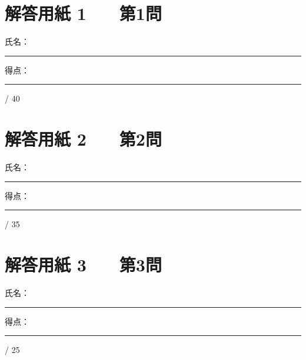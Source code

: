 \thispagestyle{fancy}
\section*{解答用紙 1　　第1問}
\begin{flushright}
氏名：\rule{45mm}{0.4pt}\qquad 得点：\rule{15mm}{0.4pt} / 40
\end{flushright}
\newpage

\section*{解答用紙 2　　第2問}
\begin{flushright}
氏名：\rule{45mm}{0.4pt}\qquad 得点：\rule{15mm}{0.4pt} / 35
\end{flushright}
\newpage

\section*{解答用紙 3　　第3問}
\begin{flushright}
氏名：\rule{45mm}{0.4pt}\qquad 得点：\rule{15mm}{0.4pt} / 25
\end{flushright}
\newpage
